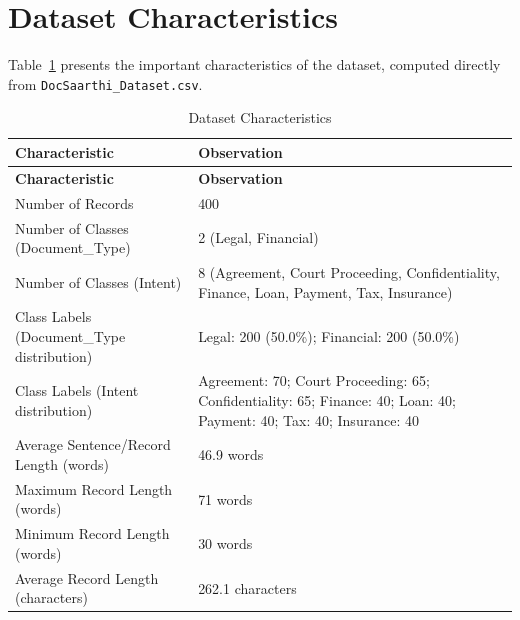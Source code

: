 
\section{Dataset Characteristics}
\label{sec:datasetcharacteristics}

Table~\ref{tab:datasetcharacteristics} presents the important characteristics of the dataset, computed directly from \texttt{DocSaarthi\_Dataset.csv}.

\renewcommand{\arraystretch}{1.5}

\begin{longtable}{|p{6cm}|p{9cm}|}
\caption{Dataset Characteristics}
\label{tab:datasetcharacteristics}\\

\hline
\textbf{Characteristic} & \textbf{Observation} \\
\hline
\endfirsthead

\hline
\textbf{Characteristic} & \textbf{Observation} \\
\hline
\endhead

Number of Records &
400
\\ \hline

Number of Classes (Document\_Type) &
2 (Legal, Financial)
\\ \hline

Number of Classes (Intent) &
8 (Agreement, Court Proceeding, Confidentiality, Finance, Loan, Payment, Tax, Insurance)
\\ \hline

Class Labels (Document\_Type distribution) &
Legal: 200 (50.0\%); Financial: 200 (50.0\%)
\\ \hline

Class Labels (Intent distribution) &
Agreement: 70; Court Proceeding: 65; Confidentiality: 65; Finance: 40; Loan: 40; Payment: 40; Tax: 40; Insurance: 40
\\ \hline

Average Sentence/Record Length (words) &
46.9 words
\\ \hline

Maximum Record Length (words) &
71 words
\\ \hline

Minimum Record Length (words) &
30 words
\\ \hline

Average Record Length (characters) &
262.1 characters
\\ \hline


\end{longtable}
